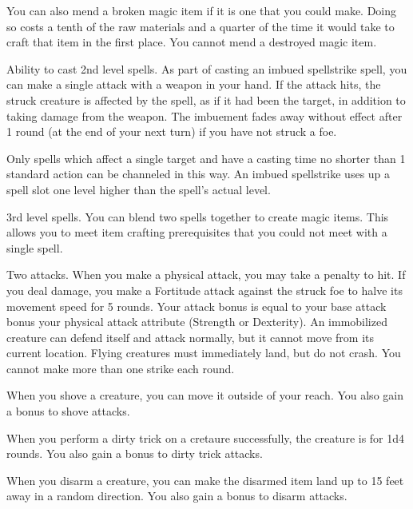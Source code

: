 You can also mend a broken magic item if it is one that you could make.
Doing so costs a tenth of the raw materials and a quarter of the time it would take to craft that item in the first place.
You cannot mend a destroyed magic item.

\featpre Ability to cast 2nd level spells.
\featben As part of casting an imbued spellstrike spell, you can make a single attack with a weapon in your hand.
If the attack hits, the struck creature is affected by the spell, as if it had been the target, in addition to taking damage from the weapon.
The imbuement fades away without effect after 1 round (at the end of your next turn) if you have not struck a foe.

Only spells which affect a single target and have a casting time no shorter than 1 standard action can be channeled in this way.
An imbued spellstrike uses up a spell slot one level higher than the spell's actual level.

\featpre 3rd level spells.
\featben You can blend two spells together to create magic items.
This allows you to meet item crafting prerequisites that you could not meet with a single spell.

\featpre Two attacks.
\featben When you make a physical attack, you may take a  penalty to hit.
If you deal damage, you make a Fortitude attack against the struck foe to halve its movement speed for 5 rounds.
Your attack bonus is equal to your base attack bonus \add your physical attack attribute (Strength or Dexterity).
An immobilized creature can defend itself and attack normally, but it cannot move from its current location.
Flying creatures must immediately land, but do not crash.
You cannot make more than one strike each round.

\featben When you shove a creature, you can move it outside of your reach.
You also gain a  bonus to shove attacks.

\featben When you perform a dirty trick on a cretaure successfully, the creature is \vulnerable for 1d4 rounds.
You also gain a  bonus to dirty trick attacks.

\featben When you disarm a creature, you can make the disarmed item land up to 15 feet away in a random direction.
You also gain a  bonus to disarm attacks.

